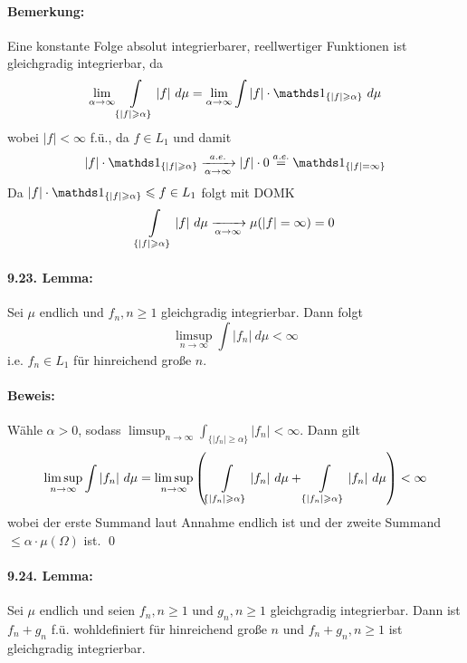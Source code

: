\documentclass[11pt]{report}
\begin{document}
\paragraph{Bemerkung:}Eine konstante Folge absolut integrierbarer, reellwertiger Funktionen ist gleichgradig integrierbar, da
$$\lim_{\alpha\to\infty}\int\displaylimits_{\{|f|\geq\alpha\}}|f|\ d\mu=\lim_{\alpha\to\infty}\int|f|\cdot\ind{\{|f|\geq\alpha\}}\ d\mu$$
wobei $|f|<\infty$ f.\"u., da $f\in L_1$ und damit 
$$|f|\cdot\ind{\{|f|\geq\alpha\}}\nto{a.e.}{\alpha\to\infty}|f|\cdot0\overset{a.e.}{=}\ind{\{|f|=\infty\}}$$
Da $|f|\cdot\ind{\{|f|\geq\alpha\}}\leq f\in L_1$ folgt mit DOMK
$$\int\displaylimits_{\{|f|\geq\alpha\}}|f|\ d\mu\nto{}{\alpha\to\infty}\mu(|f|=\infty)=0$$

\paragraph{9.23. Lemma:}Sei $\mu$ endlich und $f_n,n\geq1$ gleichgradig integrierbar. Dann folgt
$$\limsup_{n\to\infty}\int|f_n|\ d\mu<\infty$$
i.e. $f_n\in L_1$ f\"ur hinreichend gro\ss{}e $n$.

\paragraph{Beweis:}W\"ahle $\alpha>0$, sodass $\limsup_{n\to\infty}\int_{\{|f_n|\geq\alpha\}}|f_n|<\infty$. Dann gilt
$$\limsup_{n\to\infty}\int|f_n|\ d\mu=\limsup_{n\to\infty}\left(\int\displaylimits_{\{|f_n|\geq\alpha\}}|f_n|\ d\mu+\int\displaylimits_{\{|f_n|\geq\alpha\}}|f_n|\ d\mu\right)<\infty$$
wobei der erste Summand laut Annahme endlich ist und der zweite Summand $\leq\alpha\cdot\mu(\Omega)$ ist. \qed

\paragraph{9.24. Lemma:}Sei $\mu$ endlich und seien $f_n,n\geq1$ und $g_n,n\geq1$ gleichgradig integrierbar. Dann ist $f_n+g_n$ f.\"u. wohldefiniert f\"ur hinreichend gro\ss{}e $n$ und $f_n+g_n,n\geq1$ ist gleichgradig integrierbar.
\end{document}
